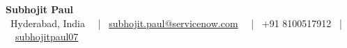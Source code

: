 \documentclass[a4paper,10pt]{article}
\begin{document}
\begin{center}
    {\Huge\bfseries Subhojit Paul} \\
    \faMapMarker \ Hyderabad, India \ \ |
    \faEnvelope \ \href{mailto:subhojit.paul@servicenow.com}{subhojit.paul@servicenow.com} \ \ |
    \faPhone \ +91 8100517912 \ | \ \faLinkedin \ \href{https://linkedin.com/in/subhojitpaul07}{subhojitpaul07}
\end{center}
\vspace{-1em} %

\end{document}
